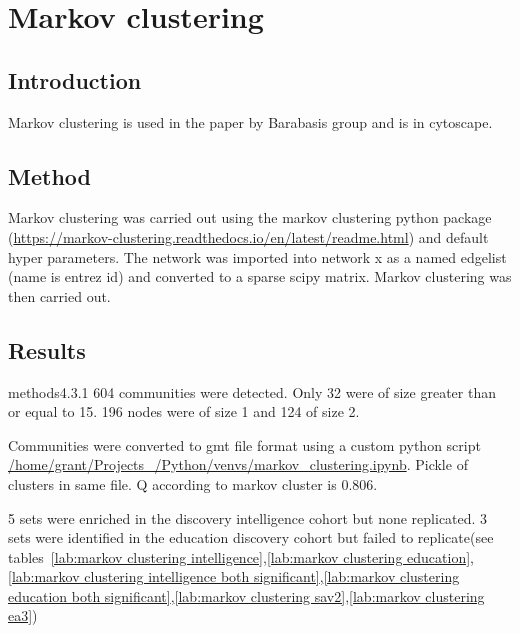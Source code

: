 \section{Markov clustering}
\label{sec:markov clustering}
\subsection{Introduction}

Markov clustering is used in the paper by Barabasis group \cite{ghiassian2015disease} and is in cytoscape. 
\subsection{Method}
Markov clustering was carried out using the markov clustering python package (\url{https://markov-clustering.readthedocs.io/en/latest/readme.html}) and default hyper parameters. The network was imported into network x as a named edgelist (name is entrez id) and converted to a sparse scipy matrix. Markov clustering was then carried out.

\subsection{Results}
methods4.3.1 
604 communities were detected. Only 32 were of size greater than or equal to 15.
196 nodes were of size 1 and 124 of size 2.

Communities were converted to gmt file format using a custom python script \url{/home/grant/Projects_/Python/venvs/markov_clustering.ipynb}. Pickle of clusters in same file. Q according to markov cluster is 0.806.

5 sets were enriched in the discovery intelligence cohort but none replicated. 3 sets were identified in the education discovery cohort but failed to replicate(see tables~\ref{lab:markov clustering intelligence},\ref{lab:markov clustering education},\ref{lab:markov clustering intelligence both significant},\ref{lab:markov clustering education both significant},\ref{lab:markov clustering sav2},\ref{lab:markov clustering ea3})

